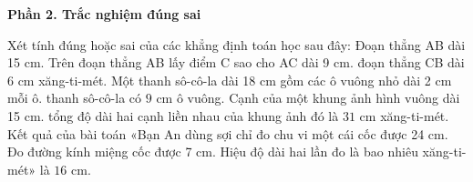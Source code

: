 \textbf{Phần 2. Trắc nghiệm đúng sai}

\begin{ex} %
Xét tính đúng hoặc sai của các khẳng định toán học sau đây:
\choiceTF
{\True Đoạn thẳng AB dài 15 cm. Trên đoạn thẳng AB lấy điểm C sao cho AC dài 9 cm. đoạn thẳng CB dài $6\text{ cm}$ xăng-ti-mét.}
{\True Một thanh sô-cô-la dài 18 cm gồm các ô vuông nhỏ dài 2 cm mỗi ô. thanh sô-cô-la có $9\text{ cm}$ ô vuông.}
{Cạnh của một khung ảnh hình vuông dài 15 cm. tổng độ dài hai cạnh liền nhau của khung ảnh đó là $31\text{ cm}$ xăng-ti-mét.}
{Kết quả của bài toán «Bạn An dùng sợi chỉ đo chu vi một cái cốc được 24 cm. Đo đường kính miệng cốc được 7 cm. Hiệu độ dài hai lần đo là bao nhiêu xăng-ti-mét» là $16\text{ cm}$.}
\end{ex}

